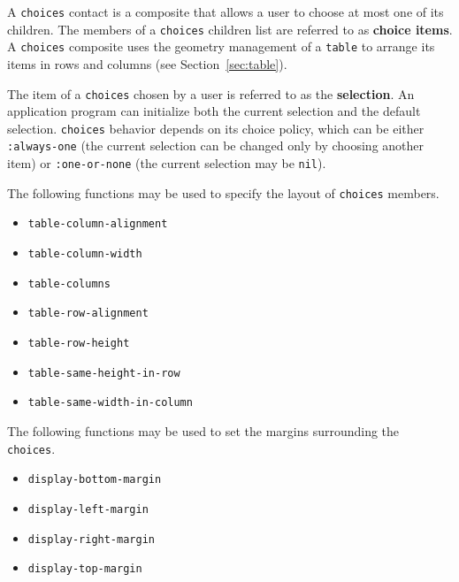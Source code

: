 \vfill
\pagebreak



A {\tt choices} contact is a composite that allows a user to choose at most one
of its children.  The members of a {\tt choices} children list are referred to
as {\bf choice items}.  A {\tt choices} composite uses the
geometry management of a {\tt table} to arrange its items in rows and columns
(see Section~\ref{sec:table}).

The item of a {\tt choices} chosen by a user is referred to as the {\bf
selection}\footnotemark{}.  An application program can initialize both
the current selection and the default selection.  {\tt choices} behavior depends
on its choice policy, which can be either {\tt :always-one} (the current
selection can be changed only by choosing another item) or {\tt :one-or-none}
(the current selection may be {\tt nil}).

The following functions may be used to specify the layout of {\tt choices}
members.

\begin{itemize}
\item {\tt table-column-alignment}
\item {\tt table-column-width}
\item {\tt table-columns}
\item {\tt table-row-alignment}
\item {\tt table-row-height}
\item {\tt table-same-height-in-row}
\item {\tt table-same-width-in-column}
\end{itemize}


The following functions may be used to set the margins surrounding the {\tt
choices}.

\begin{itemize}
\item {\tt display-bottom-margin}
\item {\tt display-left-margin}
\item {\tt display-right-margin}
\item {\tt display-top-margin}
\end{itemize}

